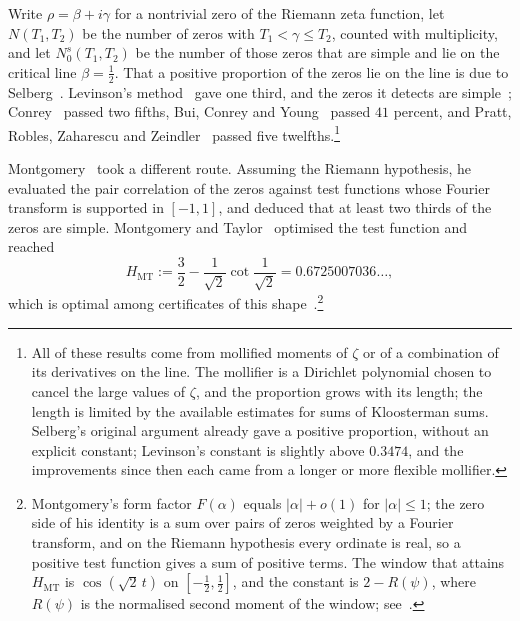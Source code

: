 \documentclass[aps,prd,twocolumn,superscriptaddress,nofootinbib,longbibliography,floatfix,showkeys,amsmath,amssymb,10pt]{revtex4-2}
\theoremstyle{definition}
\theoremstyle{remark}
\newcommand{\MT}{\mathrm{MT}}
\begin{document}
Write $\rho=\beta+i\gamma$ for a nontrivial zero of the Riemann zeta
function, let $N(T_1,T_2)$ be the number of zeros with $T_1<\gamma\le T_2$,
counted with multiplicity, and let $N_0^s(T_1,T_2)$ be the number of those
zeros that are simple and lie on the critical line $\beta=\frac12$. That a
positive proportion of the zeros lie on the line is due to
Selberg~\cite{Sel42}. Levinson's method~\cite{Lev74} gave one third, and the
zeros it detects are simple~\cite{HB79}; Conrey~\cite{Con89} passed two
fifths, Bui, Conrey and Young~\cite{BCY11} passed $41$ percent, and Pratt,
Robles, Zaharescu and Zeindler~\cite{PRZZ20} passed five
twelfths.\footnote{All of these results come from mollified moments of
$\zeta$ or of a combination of its derivatives on the line. The mollifier is
a Dirichlet polynomial chosen to cancel the large values of $\zeta$, and the
proportion grows with its length; the length is limited by the available
estimates for sums of Kloosterman sums. Selberg's original argument already
gave a positive proportion, without an explicit constant; Levinson's constant
is slightly above $0.3474$, and the improvements since then each came from a
longer or more flexible mollifier.}

Montgomery~\cite{Mon73} took a different route. Assuming the Riemann
hypothesis, he evaluated the pair correlation of the zeros against test
functions whose Fourier transform is supported in $[-1,1]$, and deduced that
at least two thirds of the zeros are simple. Montgomery and
Taylor~\cite{Mon75} optimised the test function and reached
\begin{equation}\label{eq:HMT}
 H_\MT:=\frac32-\frac1{\sqrt2}\cot\frac1{\sqrt2}=0.6725007036\ldots,
\end{equation}
which is optimal among certificates of this
shape~\cite{CCLM17}.\footnote{Montgomery's form factor $F(\alpha)$ equals
$|\alpha|+o(1)$ for $|\alpha|\le1$; the zero side of his identity is a sum
over pairs of zeros weighted by a Fourier transform, and on the Riemann
hypothesis every ordinate is real, so a positive test function gives a sum
of positive terms. The window that attains $H_\MT$ is
$\cos(\sqrt2\,t)$ on $[-\frac12,\frac12]$, and the constant is
$2-R(\psi)$, where $R(\psi)$ is the normalised second moment of the window;
see~\cite[Lemma~5.6]{AF26}.}
\end{document}
